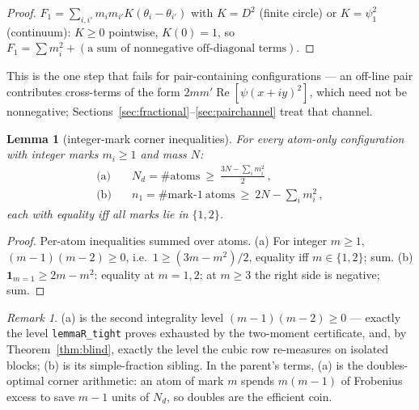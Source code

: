 \documentclass[11pt]{article}
\theoremstyle{plain}
\newtheorem{lemma}[theorem]{Lemma}
\theoremstyle{definition}
\theoremstyle{remark}
\newtheorem*{remk}{Remark}
\newcommand{\Nd}{N_{d}}
\newcommand{\one}{\mathbf{1}}
\begin{document}
\begin{proof}
$F_1 = \sum_{i, i'} m_i m_{i'} K(\theta_i - \theta_{i'})$ with $K = D^2$ (finite
circle) or $K = \psi_1^2$ (continuum): $K \ge 0$ pointwise, $K(0) = 1$, so
$F_1 = \sum m_i^2 + (\text{a sum of nonnegative off-diagonal terms})$.
\end{proof}

This is the one step that fails for pair-containing configurations --- an
off-line pair contributes cross-terms of the form
$2 m m' \operatorname{Re}[\psi(x + iy)^2]$, which need not be nonnegative;
Sections~\ref{sec:fractional}--\ref{sec:pairchannel} treat that channel.

\begin{lemma}[integer-mark corner inequalities]
\label{lem:cornerineq}
For every atom-only configuration with integer marks $m_i \ge 1$ and mass $N$:
\begin{align*}
  \text{(a)} \quad &\Nd = \#\mathrm{atoms}
    \ \ge\ \frac{3N - \sum_i m_i^2}{2}\,,\\
  \text{(b)} \quad &n_1 = \#\text{mark-}1\ \mathrm{atoms}
    \ \ge\ 2N - \sum_i m_i^2 \,,
\end{align*}
each with equality iff all marks lie in $\{1, 2\}$.
\end{lemma}

\begin{proof}
Per-atom inequalities summed over atoms. (a) For integer $m \ge 1$,
$(m - 1)(m - 2) \ge 0$, i.e.\ $1 \ge (3m - m^2)/2$, equality iff
$m \in \{1, 2\}$; sum. (b) $\one_{m = 1} \ge 2m - m^2$: equality at $m = 1, 2$;
at $m \ge 3$ the right side is negative; sum.
\end{proof}

\begin{remk}
(a) is the second integrality level $(m-1)(m-2) \ge 0$ --- exactly the level
\texttt{lemmaR\_tight} proves exhausted by the two-moment certificate, and, by
Theorem~\ref{thm:blind}, exactly the level the cubic row re-measures on isolated
blocks; (b) is its simple-fraction sibling. In the parent's terms, (a) is the
doubles-optimal corner arithmetic: an atom of mark $m$ spends $m(m-1)$ of
Frobenius excess to save $m - 1$ units of $\Nd$, so doubles are the efficient
coin.
\end{remk}
\end{document}
